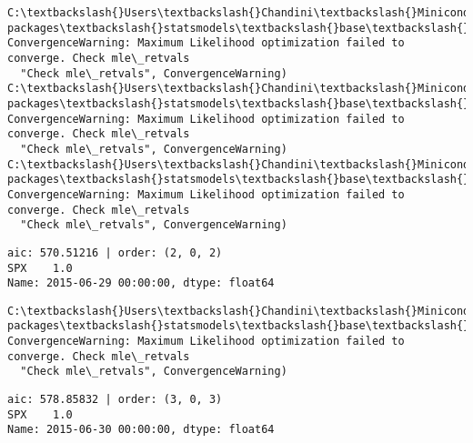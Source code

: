 \documentclass[11pt]{article}
\begin{document}
    \begin{Verbatim}[commandchars=\\\{\}]
C:\textbackslash{}Users\textbackslash{}Chandini\textbackslash{}Miniconda3\textbackslash{}envs\textbackslash{}auquan\textbackslash{}lib\textbackslash{}site-packages\textbackslash{}statsmodels\textbackslash{}base\textbackslash{}model.py:496: ConvergenceWarning: Maximum Likelihood optimization failed to converge. Check mle\_retvals
  "Check mle\_retvals", ConvergenceWarning)
C:\textbackslash{}Users\textbackslash{}Chandini\textbackslash{}Miniconda3\textbackslash{}envs\textbackslash{}auquan\textbackslash{}lib\textbackslash{}site-packages\textbackslash{}statsmodels\textbackslash{}base\textbackslash{}model.py:496: ConvergenceWarning: Maximum Likelihood optimization failed to converge. Check mle\_retvals
  "Check mle\_retvals", ConvergenceWarning)
C:\textbackslash{}Users\textbackslash{}Chandini\textbackslash{}Miniconda3\textbackslash{}envs\textbackslash{}auquan\textbackslash{}lib\textbackslash{}site-packages\textbackslash{}statsmodels\textbackslash{}base\textbackslash{}model.py:496: ConvergenceWarning: Maximum Likelihood optimization failed to converge. Check mle\_retvals
  "Check mle\_retvals", ConvergenceWarning)

    \end{Verbatim}

    \begin{Verbatim}[commandchars=\\\{\}]
aic: 570.51216 | order: (2, 0, 2)
SPX    1.0
Name: 2015-06-29 00:00:00, dtype: float64

    \end{Verbatim}

    \begin{Verbatim}[commandchars=\\\{\}]
C:\textbackslash{}Users\textbackslash{}Chandini\textbackslash{}Miniconda3\textbackslash{}envs\textbackslash{}auquan\textbackslash{}lib\textbackslash{}site-packages\textbackslash{}statsmodels\textbackslash{}base\textbackslash{}model.py:496: ConvergenceWarning: Maximum Likelihood optimization failed to converge. Check mle\_retvals
  "Check mle\_retvals", ConvergenceWarning)

    \end{Verbatim}

    \begin{Verbatim}[commandchars=\\\{\}]
aic: 578.85832 | order: (3, 0, 3)
SPX    1.0
Name: 2015-06-30 00:00:00, dtype: float64

    \end{Verbatim}
\end{document}
